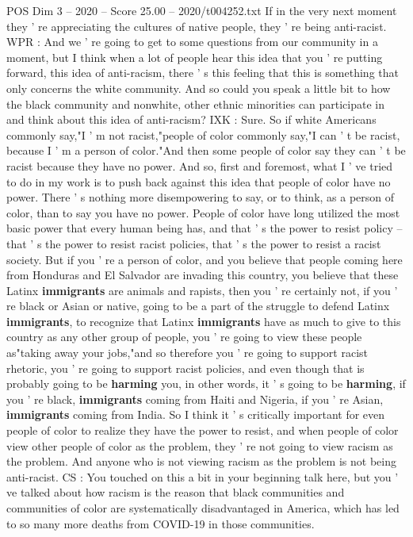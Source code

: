 \begin{textsample}{POS Dim 3 – 2020 – Score 25.00 – 2020/t004252.txt}
If in the very next moment they ' re appreciating the cultures of native people, they ' re being anti-racist.
WPR : And we ' re going to get to some questions from our community in a moment, but I think when a lot of people hear this idea that you ' re putting forward, this idea of anti-racism, there ' s this feeling that this is something that only concerns the white community.
And so could you speak a little bit to how the black community and nonwhite, other ethnic minorities can participate in and think about this idea of anti-racism?
IXK : Sure.
So if white Americans commonly say,"I ' m not racist,"people of color commonly say,"I can ' t be racist, because I ' m a person of color."And then some people of color say they can ' t be racist because they have no power.
And so, first and foremost, what I ' ve tried to do in my work is to push back against this idea that people of color have no power.
There ' s nothing more disempowering to say, or to think, as a person of color, than to say you have no power.
People of color have long utilized the most basic power that every human being has, and that ' s the power to resist policy -- that ' s the power to resist racist policies, that ' s the power to resist a racist society.
But if you ' re a person of color, and you believe that people coming here from Honduras and El Salvador are invading this country, you believe that these Latinx \textbf{immigrants} are animals and rapists, then you ' re certainly not, if you ' re black or Asian or native, going to be a part of the struggle to defend Latinx \textbf{immigrants}, to recognize that Latinx \textbf{immigrants} have as much to give to this country as any other group of people, you ' re going to view these people as"taking away your jobs,"and so therefore you ' re going to support racist rhetoric, you ' re going to support racist policies, and even though that is probably going to be \textbf{harming} you, in other words, it ' s going to be \textbf{harming}, if you ' re black, \textbf{immigrants} coming from Haiti and Nigeria, if you ' re Asian, \textbf{immigrants} coming from India.
So I think it ' s critically important for even people of color to realize they have the power to resist, and when people of color view other people of color as the problem, they ' re not going to view racism as the problem.
And anyone who is not viewing racism as the problem is not being anti-racist.
CS : You touched on this a bit in your beginning talk here, but you ' ve talked about how racism is the reason that black communities and communities of color are systematically disadvantaged in America, which has led to so many more deaths from COVID-19 in those communities.

\end{textsample}
